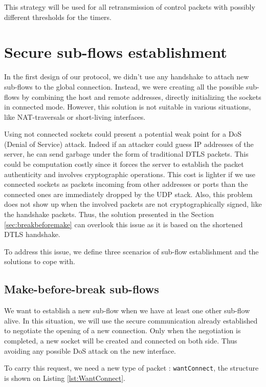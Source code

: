 This strategy will be used for all retransmission of control packets with possibly different thresholds for the timers.

\section{Secure sub-flows establishment}

In the first design of our protocol, we didn't use any handshake to attach new sub-flows to the global connection. Instead, we were creating all the possible sub-flows by combining the host and remote addresses, directly initializing the sockets in connected mode. However, this solution is not suitable in various situations, like NAT-traversals or short-living interfaces. 

Using not connected sockets could present a potential weak point for a DoS (Denial of Service) attack. Indeed if an attacker could guess IP addresses of the server, he can send garbage under the form of traditional DTLS packets. This could be computation costly since it forces the server to establish the packet authenticity and involves cryptographic operations. This cost is lighter if we use connected sockets as packets incoming from other addresses or ports than the connected ones are immediately dropped by the UDP stack. Also, this problem does not show up when the involved packets are not cryptographically signed, like the handshake packets. Thus, the solution presented in the Section \ref{sec:breakbeforemake} can overlook this issue as it is based on the shortened DTLS handshake.

To address this issue, we define three scenarios of sub-flow establishment and the solutions to cope with.

\subsection{Make-before-break sub-flows}

We want to establish a new sub-flow when we have at least one other sub-flow alive. In this situation, we will use the secure communication already established to negotiate the opening of a new connection. Only when the negotiation is completed, a new socket will be created and connected on both side. Thus avoiding any possible DoS attack on the new interface.

To carry this request, we need a new type of packet : \verb!wantConnect!, the structure is shown on Listing \ref{lst:WantConnect}.

